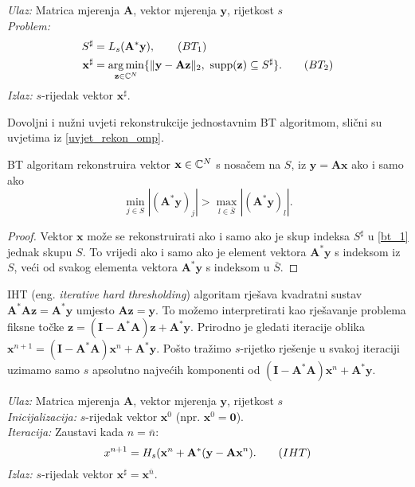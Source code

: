 \documentclass[a4paper,twoside,12pt]{memoir} %
\newcommand{\vect}[1]{\mathbf{#1}}
\renewcommand{\vec}{\vect}
\newcommand{\supp}{\text{\normalfont{supp}}}
\newcommand{\norm}[1]{\|{#1}\|}
\DeclareMathOperator*{\argmin}{arg\,min}
\newenvironment{alg}[1]
{
    \bigskip
    \begin{tcolorbox}[arc=0mm,boxrule=1.2pt,colframe=black,colback=white,detach title, before upper={\medskip\begin{center}\textbf{#1}\end{center}\hline\newline\medskip},frame hidden]
    \medskip
}
{
    \medskip
\end{tcolorbox}
    \bigskip
}
\begin{document}
\begin{alg}{BT}
    \textit{Ulaz:} Matrica mjerenja $\vec A$, vektor mjerenja $\vec y$, rijetkost $s$ \\
    \textit{Problem:}
        \begin{align*}
            S^{\sharp} &= L_s(\vec A^* \vec y),\tag{$BT_1$}\label{bt_1}\\
            \vec x^{\sharp} &= \argmin_{\vec z \in \C^N}\{\norm{\vec y - \vec{Az}}_2,\ \supp(\vec z) \subseteq S^{\sharp}\}.\tag{$BT_2$}\label{bt_2}\\
        \end{align*}
        \textit{Izlaz:} $s$-rijedak vektor $\vec x^{\sharp}$.
\end{alg}

\noindent Dovoljni i nu\v{z}ni uvjeti rekonstrukcije jednostavnim BT algoritmom, sli\v{c}ni su uvjetima iz \eqref{uvjet_rekon_omp}.
\begin{prop}\label{prop:3:7}
    BT algoritam rekonstruira vektor $\vec x \in \C^N$ s nosa\v{c}em na $S$, iz $\vec y = \vec{Ax}$ ako i samo ako
    \begin{equation}\label{bt_uvjet}
        \min_{j \in S}|(\vec A^* \vec y)_j| > \max_{l \in \bar{S}} |(\vec A^* \vec y)_l| .
    \end{equation}
\end{prop}
\begin{proof}
    Vektor $\vec x$ mo\v{z}e se rekonstruirati ako i samo ako je skup indeksa $S^{\sharp}$ u \eqref{bt_1} jednak skupu $S$. To vrijedi ako i samo ako je element vektora $\vec A^* \vec y$ s indeksom iz $S$, ve\'ci od svakog elementa vektora $\vec A^* \vec y$ s indeksom u $\bar{S}$.
\end{proof}
\indent
IHT (eng. \textit{iterative hard thresholding}) algoritam rje\v{s}ava kvadratni sustav $\vec A^* \vec A \vec z= \vec A^* \vec y$ umjesto $\vec{Az}=\vec y$. To mo\v{z}emo interpretirati kao rje\v{s}avanje problema fiksne to\v{c}ke $\vec z = (\vec{I}- \vec A^* \vec A ) \vec z + \vec A^* \vec y$. Prirodno je gledati iteracije oblika $\vec x^{n+1} = (\vec{I}- \vec A^* \vec A) \vec x^n + \vec A^* \vec y$. Po\v{s}to tra\v{z}imo $s$-rijetko rje\v{s}enje u svakoj iteraciji uzimamo samo $s$ apsolutno najve\'cih komponenti od $(\vec{I} - \vec A^* \vec A ) \vec x^n + \vec A^* \vec y$.

\begin{alg}{IHT}
    \textit{Ulaz:} Matrica mjerenja $\vec A$, vektor mjerenja $\vec y$, rijetkost $s$ \\
    \textit{Inicijalizacija:} $s$-rijedak vektor $\vec x^0$ (npr. $\vec x^0 = \vec 0$).\\
    \textit{Iteracija:} Zaustavi kada $n = \bar{n}$:
        \begin{equation}
            x^{n+1} = H_s(\vec x^n + \vec A^* (\vec y - \vec{Ax}^n).\tag{$IHT$}\label{iht}\\
        \end{equation}
        \textit{Izlaz:} $s$-rijedak vektor $\vec x^{\sharp}=\vec x^{\bar n}$.
\end{alg}
\end{document}
